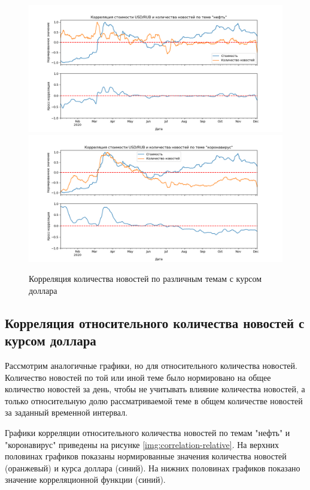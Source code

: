 \begin{figure}[h]
    \centering
    \includegraphics[width=\linewidth]{images/correlations/absolute/нефть.png}
    \includegraphics[width=\linewidth]{images/correlations/absolute/коронавирус.png}
    \caption{Корреляция количества новостей по различным темам с курсом доллара}
    \label{img:correlation-absolute}
\end{figure}


\subsection{Корреляция относительного количества новостей с курсом доллара}

Рассмотрим аналогичные графики, но для относительного количества новостей. Количество новостей по той или иной теме было нормировано на общее количество новостей за день, чтобы не учитывать влияние количества новостей, а только относительную долю рассматриваемой теме в общем количестве новостей за заданный временной интервал.

Графики корреляции относительного количества новостей по темам "нефть" и "коронавирус" приведены на рисунке \ref{img:correlation-relative}. На верхних половинах графиков показаны нормированные значения количества новостей (оранжевый) и курса доллара (синий). На нижних половинах графиков показано значение корреляционной функции (синий).

